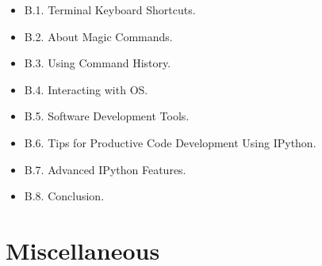 \documentclass{article}
\begin{document}
\begin{enumerate}
\begin{itemize}
\begin{itemize}
			\item {\sf B.1. Terminal Keyboard Shortcuts.}
			\item {\sf B.2. About Magic Commands.}
			\item {\sf B.3. Using Command History.}
			\item {\sf B.4. Interacting with OS.}
			\item {\sf B.5. Software Development Tools.}
			\item {\sf B.6. Tips for Productive Code Development Using IPython.}
			\item {\sf B.7. Advanced IPython Features.}
			\item {\sf B.8. Conclusion.}
		\end{itemize}
	\end{itemize}	
\end{enumerate}


\section{Miscellaneous}


\printbibliography[heading=bibintoc]
	
\end{document}
